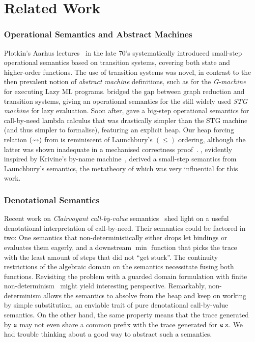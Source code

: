 \pagebreak
\section{Related Work}
\label{sec:related-work}

\subsubsection*{Operational Semantics and Abstract Machines}
Plotkin's Aarhus lectures~\citep{Plotkin:81} in the late 70's systematically
introduced small-step operational semantics based on transition systems,
covering both state and higher-order functions.
The use of transition systems was novel, in contrast to the then
prevalent notion of \emph{abstract machine} definitions, such as for the
\emph{G-machine}~\citet{Johnsson:84} for executing Lazy ML programs.
\citet{SPJ:92} bridged the gap between graph reduction and transition systems,
giving an operational semantics for the still widely used \emph{STG machine} for
lazy evaluation.
Soon after, \citet{Launchbury:93} gave a big-step operational semantics for
call-by-need lambda calculus that was drastically simpler than the STG machine
(and thus simpler to formalise), featuring an explicit heap.
Our heap forcing relation $(\rightsquigarrow)$ from  is reminiscent
of Launchbury's $(\leq)$ ordering, although the latter was shown
inadequate in a mechanised correctness proof~\citep[Section 2.3.3]{Breitner:18}.
\citet{Sestoft:97}, evidently inspired by Krivine's by-name
machine~\citep{AgerDanvyMidtgaard:04}, derived a small-step semantics from
Launchbury's semantics, the metatheory of which was very influential for this
work.

\subsubsection*{Denotational Semantics}
Recent work on \emph{Clairvoyant call-by-value}
semantics~\citep{HackettHutton:19} shed light on a useful denotational
interpretation of call-by-need.
Their semantics could be factored in two:
One semantics that non-deterministically either drops let
bindings or evaluates them eagerly, and a downstream $\min$ function that picks
the trace with the least amount of steps that did not ``get stuck''.
The continuity restrictions of the algebraic domain on the semantics necessitate
fusing both functions.
Revisiting the problem with a guarded domain formulation with finite
non-determinism~\citep{Mogelberg:21} might yield interesting perspective.
Remarkably, non-determinism allows the semantics to absolve from the heap and
keep on working by simple substitution, an enviable trait of pure denotational
call-by-value semantics.
On the other hand, the same property means that the trace generated by $\mathsf{e}$
may not even share a common prefix with the trace generated for $\mathsf{e}~\mathsf{x}$.
We had trouble thinking about a good way to abstract such a semantics.

